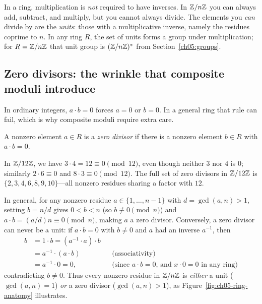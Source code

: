 \begin{focusbox}
In a ring, multiplication is \emph{not} required to
have inverses. In $\mathbb{Z}/n\mathbb{Z}$ you can always add, subtract, and multiply, but you cannot
always divide. The elements you \emph{can} divide by are the \emph{units}: those
with a multiplicative inverse, namely the residues coprime to $n$. In any ring $R$, the set of units forms a group under multiplication; for $R = \mathbb{Z}/n\mathbb{Z}$ that unit group is
$(\mathbb{Z}/n\mathbb{Z})^{*}$ from Section~\ref{ch05:groups}.
\end{focusbox}

\subsection{Zero divisors: the wrinkle that composite moduli introduce}

In ordinary integers, $a\cdot b = 0$ forces $a=0$ or $b=0$. In a general ring that rule can
fail, which is why composite moduli require extra care.

\begin{definition}
\label{ch05:def-zerodiv}
A nonzero element $a \in R$ is a \emph{zero divisor} if there is a nonzero element $b \in R$ with $a\cdot b = 0$.
\end{definition}

\begin{example}
\label{ch05:ex-zerodiv-12}
In $\mathbb{Z}/12\mathbb{Z}$, we have $3\cdot 4 = 12 \equiv 0 \pmod{12}$, even though neither $3$ nor $4$ is $0$; similarly $2\cdot 6 \equiv 0$ and $8\cdot 3 \equiv 0 \pmod{12}$. The full set of zero divisors in $\mathbb{Z}/12\mathbb{Z}$ is $\{2, 3, 4, 6, 8, 9, 10\}$---all nonzero residues sharing a factor with $12$.

In general, for any nonzero residue $a \in \{1,\dots,n-1\}$ with $d = \gcd(a,n) > 1$, setting $b = n/d$ gives $0 < b < n$ (so $b \not\equiv 0 \pmod n$) and $a\cdot b = (a/d)n \equiv 0 \pmod n$, making $a$ a zero divisor. Conversely, a zero divisor can never be a unit: if $a\cdot b = 0$ with $b \ne 0$ and $a$ had an inverse $a^{-1}$, then
\[
\begin{aligned}
  b &= 1 \cdot b = (a^{-1}\cdot a)\cdot b \\
    &= a^{-1}\cdot(a\cdot b) &&\text{(associativity)} \\
    &= a^{-1}\cdot 0 = 0, &&\text{(since $a\cdot b = 0$, and $x\cdot 0 = 0$ in any ring)}
\end{aligned}
\]
contradicting $b \ne 0$. Thus every nonzero residue in $\mathbb{Z}/n\mathbb{Z}$ is \emph{either} a unit ($\gcd(a,n)=1$) \emph{or} a zero divisor ($\gcd(a,n)>1$), as Figure~\ref{fig:ch05-ring-anatomy} illustrates.
\end{example}

